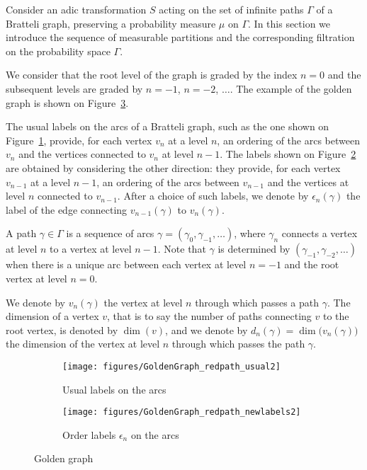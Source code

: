 \documentclass[12pt,a4paper]{article}
\begin{document}
Consider an adic transformation $S$ acting on the set of infinite paths $\Gamma$ of a 
Bratteli graph, preserving a probability measure $\mu$ on $\Gamma$. 
In this section we introduce the sequence of measurable partitions 
and the corresponding filtration on the probability space $\Gamma$.

We consider that the root level of the graph is graded by the index 
$n=0$ and the subsequent levels are graded by $n=-1$, $n=-2$, $\ldots$. 
The example of the golden graph is shown on Figure~\ref{fig:goldengraph}. 

The usual labels on the arcs of a Bratteli graph, such as the one 
shown on Figure~\ref{fig:GoldenGraph}, provide, for each vertex $v_n$ 
at a level $n$, an ordering of the arcs between $v_n$ and the vertices connected 
to $v_n$ at level $n-1$.  
The labels shown on Figure~\ref{fig:GoldenGraph_newlabs}  
are obtained by considering the other direction: they provide, 
for each vertex $v_{n-1}$ at a level $n-1$, 
an ordering of the arcs between $v_{n-1}$ and the vertices at level $n$ connected 
to $v_{n-1}$. 
After a choice of such labels, we denote 
by $\boxed{\epsilon_n(\gamma)}$ the label of the edge connecting $v_{n-1}(\gamma)$ to 
$v_n(\gamma)$. 



A path $\gamma \in \Gamma$ is a sequence of arcs 
$\gamma=(\gamma_0, \gamma_{-1}, \ldots)$, where $\gamma_n$ connects 
a vertex at level $n$ to a vertex at level $n-1$. 
Note that $\gamma$ is determined by $(\gamma_{-1}, \gamma_{-2}, \ldots)$ 
when there is a unique arc between each vertex at level $n=-1$ and the root vertex 
at level $n=0$.  

We denote by $v_n(\gamma)$ the vertex at level $n$ through which passes a path $\gamma$. 
The dimension of a vertex $v$, that is to say the number of paths connecting $v$ 
to the root vertex, is denoted by $\dim(v)$, and we denote by 
$\boxed{d_n(\gamma)=\dim\bigl(v_n(\gamma)\bigr)}$ the dimension of the vertex at level $n$ 
through which passes the path $\gamma$. 


\begin{figure}[!h]
   \centering
   \begin{subfigure}[t]{0.37\textwidth}
   \centering
   	\texttt{[image: figures/GoldenGraph\_redpath\_usual2]}
 		\caption{\footnotesize Usual labels on the arcs}\label{fig:GoldenGraph}
    \end{subfigure}              
   \quad
    \begin{subfigure}[t]{0.37\textwidth}
    \centering
   	\texttt{[image: figures/GoldenGraph\_redpath\_newlabels2]}
 		\caption{\footnotesize Order labels $\epsilon_n$ on the arcs}\label{fig:GoldenGraph_newlabs}
 	\end{subfigure}      
   \caption{Golden graph}
   \label{fig:goldengraph}
 \end{figure}
\end{document}
